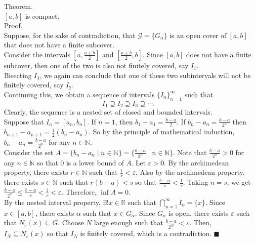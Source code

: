 \documentclass[twocolumn]{article}
\newcommand{\qed}{$\blacksquare$}
\let\eps\varepsilon
\newcommand{\naturals}{\mathbb{N}}
\newcommand{\reals}{\mathbb{R}}
\begin{document}
Theorem. \\
$[a, b]$ is compact. \\
Proof. \\
Suppose, for the sake of contradiction, that $\mathcal{G} = \{ G_\alpha \}$ is an open cover of $[a, b]$ that does not have a finite subcover. \\
Consider the intervals $[a, \frac{a + b}{2}]$ and $[\frac{a + b}{2}, b]$. Since $[a, b]$ does not have a finite subcover, then one of the two is also not finitely covered, say $I_1$. \\
Bisecting $I_1$, we again can conclude that one of these two subintervals will not be finitely covered, say $I_2$. \\
Continuing this, we obtain a sequence of intervals $\{ I_n \}_{n = 1}^\infty$ such that
$$I_1 \supseteq I_2 \supseteq I_3 \supseteq \cdots \text{.}$$
Clearly, the sequence is a nested set of closed and bounded intervals. \\
Suppose that $I_n = [a_n, b_n]$. If $n = 1$, then $b_1 - a_1 = \frac{b - a}{2}$. If $b_n - a_n = \frac{b - a}{2^n}$ then $b_{n + 1} - a_{n + 1} = \frac{1}{2}(b_n - a_n)$. So by the principle of mathematical induction, $b_n - a_n = \frac{b - a}{2^n}$ for any $n \in \naturals$. \\
Consider the set $A = \{ b_n - a_n \mid n \in \naturals \} = \{ \frac{b - a}{2^n} \mid n \in \naturals \}$. Note that $\frac{b - a}{2^n} > 0$ for any $n \in \naturals$ so that $0$ is a lower bound of $A$. Let $\eps > 0$. By the archimedean property, there exists $r \in \naturals$ such that $\frac{1}{r} < \eps$. Also by the archimedean property, there exists $s \in \naturals$ such that $r(b - a) < s$ so that $\frac{b - a}{s} < \frac{1}{r}$. Taking $n = s$, we get $\frac{b - a}{2^n} \leq \frac{b - a}{s} < \frac{1}{r} < \eps$. Therefore, $\inf A = 0$. \\
By the nested interval property, $\exists! x \in \reals$ such that $\bigcap_{n = 1}^\infty I_n = \{ x \}$. Since $x \in [a, b]$, there exists $\alpha$ such that $x \in G_\alpha$. Since $G_\alpha$ is open, there exists $\eps$ such that $N_\eps(x) \subseteq G$. Choose $N$ large enough such that $\frac{b - a}{2^N} < \eps$. Then, $I_N \subseteq N_\eps(x)$ so that $I_N$ is finitely covered, which is a contradiction. \qed \\
\end{document}
